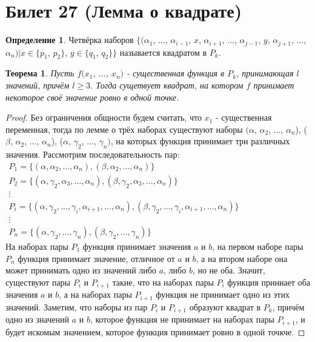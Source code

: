 \documentclass[a4paper, 12pt]{article}
\theoremstyle{definition}
\newtheorem*{definition}{Определение}
\theoremstyle{plain}
\newtheorem*{theorem}{Теорема}
\theoremstyle{remark}
\begin{document}
  \section{Билет 27 (Лемма о квадрате)}
  \begin{definition}
    Четвёрка наборов $\{(\alpha_1$, $\ldots$, $\alpha_{i-1}$, $x$, $\alpha_{i+1}$, $\ldots$, $\alpha_{j-1}$, $y$, $\alpha_{j+1}$, $\ldots$, $\alpha_n)|x\in \{p_1$, $p_2\}$, $y\in\{q_1$, $q_2\}\}$ называется квадратом в $P_k$.
  \end{definition}
  \begin{theorem}
    Пусть $f(x_1$, $\ldots$, $x_n)$ - существенная функция в $P_k$, принимающая $l$ значений, причём $l\geqslant3$. Тогда сущетвует квадрат, на котором $f$ принимает некоторое своё значение ровно в одной точке.
  \end{theorem}
  \begin{proof}
    Без ограничения общности будем считать, что $x_1$ - существенная переменная, тогда по лемме о трёх наборах существуют наборы $(\alpha$, $\alpha_2$, $\ldots$, $\alpha_n$), ($\beta$, $\alpha_2$, $\ldots$, $\alpha_n$), ($\alpha$, $\gamma_2$, $\ldots$, $\gamma_n)$, на которых функция принимает три различных значения. Рассмотрим последовательность пар:\\
    $\begin{matrix}
      P_1=\{(\alpha, \alpha_2, \ldots, \alpha_n), (\beta, \alpha_2, \ldots, \alpha_n)\}\\
      P_2=\{(\alpha, \gamma_2, \alpha_3, \ldots, \alpha_n), (\beta, \gamma_2, \alpha_3, \ldots, \alpha_n)\}\\
      \vdots\\
      P_i=\{(\alpha, \gamma_2, \ldots, \gamma_i, \alpha_{i+1}, \ldots, \alpha_n), (\beta, \gamma_2, \ldots, \gamma_i, \alpha_{i+1}, \ldots, \alpha_n)\}\\
      \vdots\\
      P_n=\{(\alpha, \gamma_2, \ldots, \gamma_n), (\beta, \gamma_2, \ldots, \gamma_n)\}
    \end{matrix}$\\
    На наборах пары $P_1$ функция принимает значения $a$ и $b$, на первом наборе пары $P_n$ функция принимает значение, отличное от $a$ и $b$, а на втором наборе она может принимать одно из значений либо $a$, либо $b$, но не оба. Значит, существуют пары $P_i$ и $P_{i+1}$ такие, что на наборах пары $P_i$ функция приниает оба значения $a$ и $b$, а на наборах пары $P_{i+1}$ функция не принимает одно из этих значений. Заметим, что наборы из пар $P_i$ и $P_{i+1}$ образуют квадрат в $P_k$, причём одно из значений $a$ и $b$, которое функция не принимает на наборах пары $P_{i+1}$, и будет искомым значением, которое функция принимает ровно в одной точкче.
  \end{proof}
\end{document}
